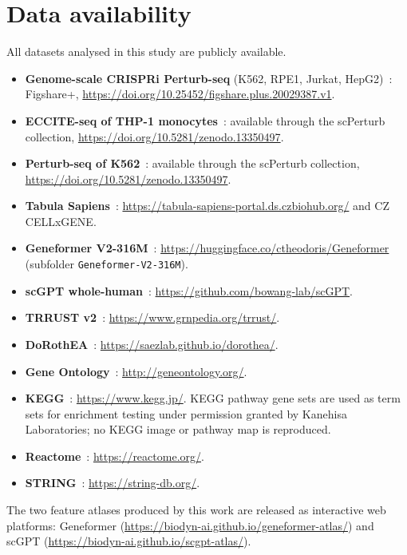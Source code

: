 \section*{Data availability}
All datasets analysed in this study are publicly available.

\begin{itemize}\itemsep2pt
\item \textbf{Genome-scale CRISPRi Perturb-seq} (K562, RPE1, Jurkat, HepG2)~\cite{replogle2022mapping}:
Figshare+, \url{https://doi.org/10.25452/figshare.plus.20029387.v1}.
\item \textbf{ECCITE-seq of THP-1 monocytes}~\cite{papalexi2021eccite}: available through the
scPerturb collection, \url{https://doi.org/10.5281/zenodo.13350497}.
\item \textbf{Perturb-seq of K562}~\cite{norman2019exploring}: available through the scPerturb
collection, \url{https://doi.org/10.5281/zenodo.13350497}.
\item \textbf{Tabula Sapiens}~\cite{tabula2022tabula}:
\url{https://tabula-sapiens-portal.ds.czbiohub.org/} and CZ CELLxGENE.
\item \textbf{Geneformer V2-316M}~\cite{theodoris2023transfer}:
\url{https://huggingface.co/ctheodoris/Geneformer} (subfolder \texttt{Geneformer-V2-316M}).
\item \textbf{scGPT whole-human}~\cite{cui2024scgpt}: \url{https://github.com/bowang-lab/scGPT}.
\item \textbf{TRRUST v2}~\cite{han2018trrust}: \url{https://www.grnpedia.org/trrust/}.
\item \textbf{DoRothEA}~\cite{garcia-alonso2019dorothea}: \url{https://saezlab.github.io/dorothea/}.
\item \textbf{Gene Ontology}~\cite{ashburner2000go}: \url{http://geneontology.org/}.
\item \textbf{KEGG}~\cite{kanehisa2000kegg}: \url{https://www.kegg.jp/}. KEGG pathway gene sets are
used as term sets for enrichment testing under permission granted by Kanehisa Laboratories; no
KEGG image or pathway map is reproduced.
\item \textbf{Reactome}~\cite{jassal2020reactome}: \url{https://reactome.org/}.
\item \textbf{STRING}~\cite{szklarczyk2023string}: \url{https://string-db.org/}.
\end{itemize}

\noindent
The two feature atlases produced by this work are released as interactive web platforms:
Geneformer (\url{https://biodyn-ai.github.io/geneformer-atlas/}) and scGPT
(\url{https://biodyn-ai.github.io/scgpt-atlas/}).

